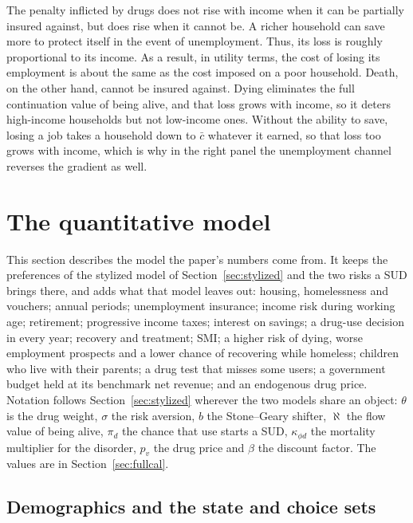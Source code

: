 \documentclass[10pt]{article}
\begin{document}
The penalty inflicted by drugs does not rise with income when it can be partially insured against, but does rise when it cannot be.   A richer household can save more to protect itself in the event of unemployment. Thus, its loss is roughly proportional to its income. As a result, in utility terms, the cost of losing its employment is about the same as the cost imposed on a poor household. Death, on the other hand, cannot be insured against.   Dying eliminates the full continuation value of being alive, and that loss grows with income, so it deters high-income households but not low-income ones. Without the ability to save, losing a job takes a household down to $\bar c$ whatever it earned, so that loss too grows with income, which is why in the right panel the unemployment channel reverses the gradient as well.

\section{The quantitative model}\label{sec:full}

This section
describes the model the paper's numbers come from. It keeps the preferences of the stylized
model of Section~\ref{sec:stylized} and the two risks a SUD brings there, and adds what that model leaves out: housing, homelessness and vouchers; annual periods; unemployment insurance; income risk during working age; retirement; progressive income taxes; interest on savings; a drug-use decision in every year; recovery and treatment; SMI; a higher risk of dying, worse employment prospects and a lower chance of recovering while homeless; children who live with their parents; a drug test that misses some users; a government budget held at its benchmark net revenue; and an endogenous drug price. Notation follows
Section~\ref{sec:stylized} wherever the two models share an object: $\theta$ is the drug weight, $\sigma$ the risk aversion, $b$ the  Stone--Geary shifter, $\aleph$ the flow value of being alive, $\pi_d$ the chance that use starts a SUD, $\kappa_{\phi d}$ the mortality multiplier for the disorder, $p_v$ the drug price and $\beta$ the discount factor. The values are in Section~\ref{sec:fullcal}.

\subsection{Demographics and the state and choice sets}
\end{document}
